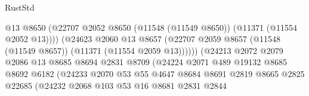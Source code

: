 \begin{lexlean}{RustStd}
\begin{coremodule}
                                            @13
                                            @8650
                                            (@22707
                                              @2052
                                              @8650
                                              (@11548 (@11549 @8650))
                                              (@11371 (@11554 @2052 @13))))
                                          (@24623
                                            @2060
                                            @13
                                            @8657
                                            (@22707
                                              @2059
                                              @8657
                                              (@11548 (@11549 @8657))
                                              (@11371 (@11554 @2059 @13))))))
                                      (@24213
                                        @2072
                                        @2079
                                        @2086
                                        @13
                                        @8685
                                        @8694
                                        @2831
                                        @8709
                                        (@24224
                                          @2071
                                          @489
                                          @19132
                                          @8685
                                          @8692
                                          @6182
                                          (@24233
                                            @2070
                                            @53
                                            @55
                                            @4647
                                            @8684
                                            @8691
                                            @2819
                                            @8665
                                            @2825
                                            @22685
                                            (@24232
                                              @2068
                                              @103
                                              @53
                                              @16
                                              @8681
                                              @2831
                                              @2844

\end{coremodule}
\end{lexlean}
